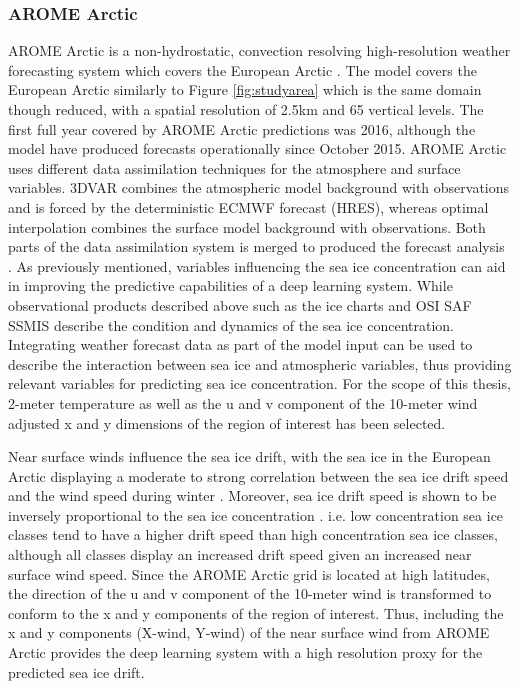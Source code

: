 \documentclass[../main/thesis.tex]{subfiles}
\begin{document}
\subsubsection{AROME Arctic}
\label{sec:arome}
AROME Arctic is a non-hydrostatic, convection resolving high-resolution weather forecasting system which covers the European Arctic \citep{Mueller2017}. The model covers the European Arctic similarly to Figure \ref{fig:studyarea} which is the same domain though reduced, with a spatial resolution of 2.5km and 65 vertical levels. The first full year covered by AROME Arctic predictions was 2016, although the model have produced forecasts operationally since October 2015. AROME Arctic uses different data assimilation techniques for the atmosphere and surface variables. 3DVAR combines the atmospheric model background with observations and is forced by the deterministic ECMWF forecast (HRES), whereas optimal interpolation combines the surface model background with observations. Both parts of the data assimilation system is merged to produced the forecast analysis \citep{Mueller2017}. As previously mentioned, variables influencing the sea ice concentration can aid in improving the predictive capabilities of a deep learning system. While observational products described above such as the ice charts \citep{Dinessen2020} and OSI SAF SSMIS \citep{Tonboe2017} describe the condition and dynamics of the sea ice concentration. Integrating weather forecast data as part of the model input can be used to describe the interaction between sea ice and atmospheric variables, thus providing relevant variables for predicting sea ice concentration. For the scope of this thesis, 2-meter temperature as well as the u and v component of the 10-meter wind adjusted x and y dimensions of the region of interest has been selected.

Near surface winds influence the sea ice drift, with the sea ice in the European Arctic displaying a moderate to strong correlation between the sea ice drift speed and the wind speed during winter \citep{Spreen2011}. Moreover, sea ice drift speed is shown to be inversely proportional to the sea ice concentration \citep{Yu2020}. i.e. low concentration sea ice classes tend to have a higher drift speed than high concentration sea ice classes, although all classes display an increased drift speed given an increased near surface wind speed. Since the AROME Arctic grid is located at high latitudes, the direction of the u and v component of the 10-meter wind is transformed to conform to the x and y components of the region of interest.
Thus, including the x and y components (X-wind, Y-wind) of the near surface wind from AROME Arctic provides the deep learning system with a high resolution proxy for the predicted sea ice drift. 
\end{document}
